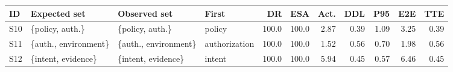 \begin{tabular}{@{}llllrrrrrrr@{}}
\toprule
ID & Expected set & Observed set & First & DR & ESA & Act. & DDL & P95 & E2E & TTE \\
\midrule
S10 & \{policy, auth.\} & \{policy, auth.\} & policy & 100.0 & 100.0 & 2.87 & 0.39 & 1.09 & 3.25 & 0.39 \\
S11 & \{auth., environment\} & \{auth., environment\} & authorization & 100.0 & 100.0 & 1.52 & 0.56 & 0.70 & 1.98 & 0.56 \\
S12 & \{intent, evidence\} & \{intent, evidence\} & intent & 100.0 & 100.0 & 5.94 & 0.45 & 0.57 & 6.46 & 0.45 \\
\bottomrule
\end{tabular}
